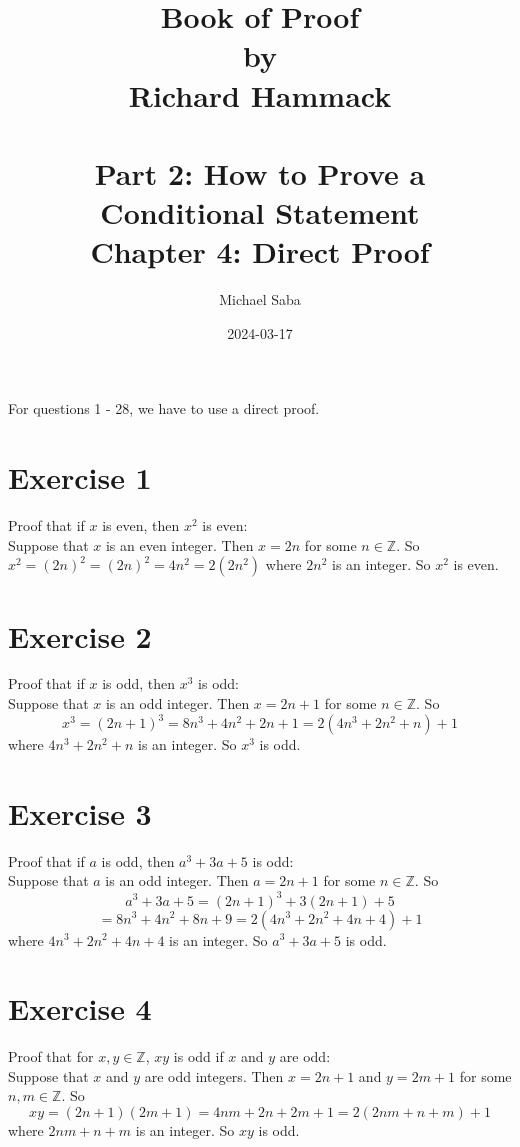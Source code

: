 \documentclass[12pt]{article}
\title{%
    \Huge Book of Proof \\
    \large by \\
    \Large Richard Hammack \\~\\
    \huge Part 2: How to Prove a Conditional Statement \\
    \LARGE Chapter 4: Direct Proof
}
\date{2024-03-17}
\author{Michael Saba}
\newcommand{\Z}{\mathbb{Z}}
\begin{document}
    \maketitle
    \newpage

    For questions 1 - 28, we have to use a direct proof. \\

    \section*{Exercise 1}
    Proof that if $x$ is even,
    then $x^2$ is even: \\
    Suppose that $x$ is an even integer.
    Then $x = 2n$ for some $n \in \Z$.
    So $x^2 = (2n)^2 = (2n)^2 = 4n^2 = 2(2n^2)$
    where $2n^2$ is an integer.
    So $x^2$ is even.

    \section*{Exercise 2}
    Proof that if $x$ is odd,
    then $x^3$ is odd: \\
    Suppose that $x$ is an odd integer.
    Then $x = 2n+1$ for some $n \in \Z$.
    So
    \[ x^3 = (2n+1)^3 = 8n^3 + 4n^2 + 2n + 1 = 2(4n^3 + 2n^2 + n) + 1 \]
    where $4n^3 + 2n^2 + n$ is an integer.
    So $x^3$ is odd. \\

    \section*{Exercise 3}
    Proof that if $a$ is odd,
    then $a^3 + 3a + 5$ is odd: \\
    Suppose that $a$ is an odd integer.
    Then $a = 2n+1$ for some $n \in \Z$.
    So 
    \[ a^3 + 3a + 5 = (2n+1)^3 + 3(2n+1) + 5 \]
    \[ = 8n^3 + 4n^2 + 8n + 9 = 2(4n^3 + 2n^2 + 4n + 4) + 1 \]
    where $4n^3 + 2n^2 + 4n + 4$ is an integer.
    So $a^3 + 3a + 5$ is odd. \\

    \section*{Exercise 4}
    Proof that for $x, y \in \Z$,
    $xy$ is odd if $x$ and $y$ are odd: \\
    Suppose that $x$ and $y$ are odd integers.
    Then $x = 2n+1$ and $y = 2m+1$ for some $n, m \in \Z$.
    So 
    \[ xy = (2n+1)(2m+1) = 4nm + 2n + 2m + 1 = 2(2nm + n + m) + 1\]
    where $2nm + n + m$ is an integer.
    So $xy$ is odd. \\
\end{document}
